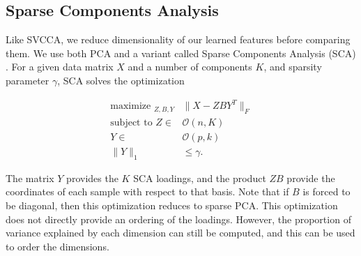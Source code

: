 \subsection{Sparse Components Analysis}

Like SVCCA, we reduce dimensionality of our learned features before comparing
them. We use both PCA and a variant called Sparse Components Analysis (SCA)
\citep{chen2020new}. For a given data matrix $X$ and a number of components $K$,
and sparsity parameter $\gamma$, SCA solves the optimization

\begin{align*}
  \text{maximize }_{Z, B, Y} &\|X - Z B Y^{T}\|_{F} \\
  \text{subject to }Z \in &\mathcal{O}\left(n, K\right) \\
  Y \in &\mathcal{O}\left(p, k\right) \\
  \|Y\|_{1} &\leq \gamma.
\end{align*}

The matrix $Y$ provides the $K$ SCA loadings, and the product $ZB$ provide the
coordinates of each sample with respect to that basis. Note that if $B$ is
forced to be diagonal, then this optimization reduces to sparse PCA. This
optimization does not directly provide an ordering of the loadings. However, the
proportion of variance explained by each dimension can still be computed, and
this can be used to order the dimensions.
